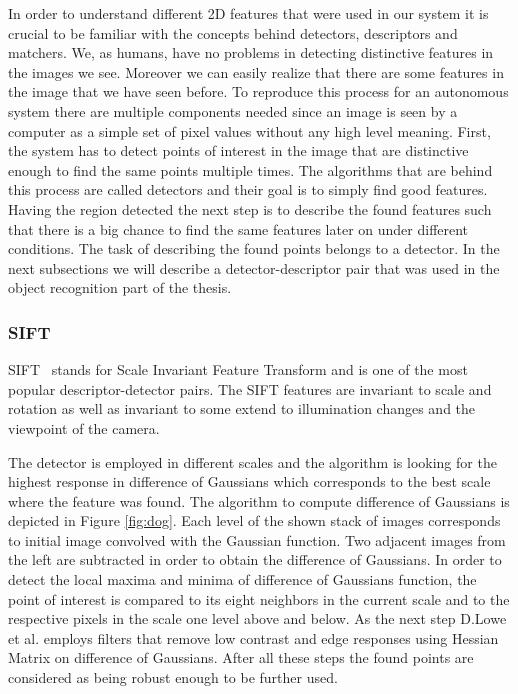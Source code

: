 In order to understand different 2D features that were used in our system it is crucial to be familiar with the concepts behind detectors, descriptors and matchers. We, as humans, have no problems in detecting distinctive features in the images we see. Moreover we can easily realize that there are some features in the image that we have seen before. To reproduce this process for an autonomous system there are multiple components needed since an image is seen by a computer as a simple set of pixel values without any high level meaning. First, the system has to detect points of interest in the image that are distinctive enough to find the same points multiple times. The algorithms that are behind this process are called detectors and their goal is to simply find good features. Having the region detected the next step is to describe the found features such that there is a big chance to find the same features later on under different conditions. The task of describing the found points belongs to a detector. In the next subsections we will describe a detector-descriptor pair that was used in the object recognition part of the thesis.

\subsubsection{SIFT}
SIFT~\cite{lowe2004distinctive} stands for Scale Invariant Feature Transform and is one of the most popular descriptor-detector pairs. The SIFT features are invariant to scale and rotation as well as invariant to some extend to illumination changes and the viewpoint of the camera.  

The detector is employed in different scales and the algorithm is looking for the highest response in difference of Gaussians which corresponds to the best scale where the feature was found. The algorithm to compute difference of Gaussians is depicted in Figure \ref{fig:dog}. Each level of the shown stack of images corresponds to initial image convolved with the Gaussian function. Two adjacent images from the left are subtracted in order to obtain the difference of Gaussians. In order to detect the local maxima and minima of difference of Gaussians function, the point of interest is compared to its eight neighbors in the current scale and to the respective pixels in the scale one level above and below. As the next step D.Lowe et al. employs filters that remove low contrast and edge responses using Hessian Matrix on difference of Gaussians. After all these steps the found points are considered as being robust enough to be further used.

